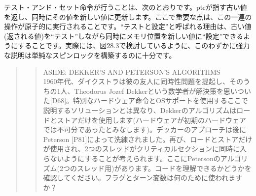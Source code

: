 \begin{Shaded}
\begin{Highlighting}[]
 
 
 
\NormalTok{ \}}
\end{Highlighting}
\end{Shaded}

テスト・アンド・セット命令が行うことは、次のとおりです。ptrが指す古い値を返し、同時にその値を新しい値に更新します。ここで重要な点は、この一連の操作が原子的に実行されることです。``テストと設定''と呼ばれる理由は、古い値(返される値)を``テスト''しながら同時にメモリ位置を新しい値に``設定''できるようにすることです。実際には、図28.3で検討しているように、このわずかに強力な説明は単純なスピンロックを構築するのに十分です。

\begin{quote}
\begin{quote}
ASIDE: DEKKER'S AND PETERSON'S ALGORITHMS\\
1960年代、ダイクストラは彼の友人に同時性問題を提起し、そのうちの1人、Theodorus
Jozef
Dekkerという数学者が解決策を思いついた{[}D68{]}。特別なハードウェア命令とOSサポートを使用するここで説明するソリューションとは異なり、Dekkerのアルゴリズムはロードとストアだけを使用します(ハードウェアが初期のハードウェアでは不可分であったとみなします)。デッカーのアプローチは後にPeterson
{[}P81{]}によって洗練されました。再び、ロードとストアだけが使用され、2つのスレッドがクリティカルセクションに同時に入らないようにすることが考えられます。ここにPetersonのアルゴリズム(2つのスレッド用)があります。コードを理解できるかどうかを確認してください。フラグとターン変数は何のために使われますか？
\end{quote}
\end{quote}

